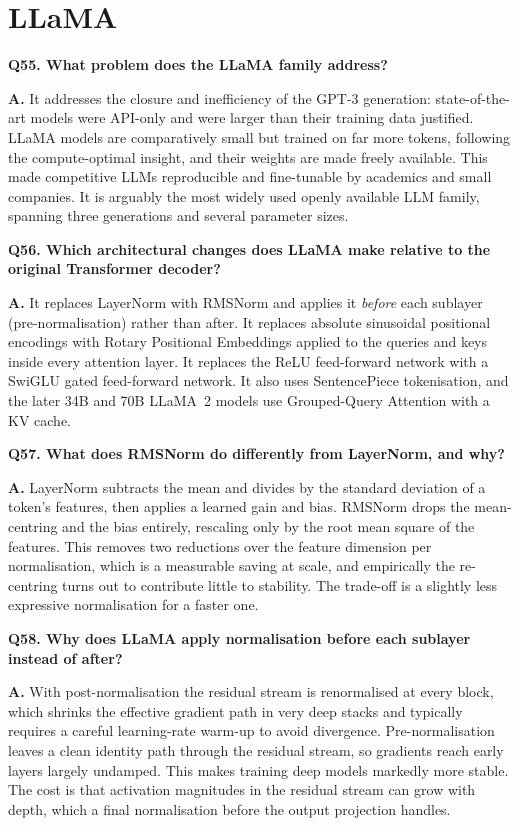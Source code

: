 \documentclass[11pt]{article}
\begin{document}
\section{LLaMA}

\noindent\textbf{Q55. What problem does the LLaMA family address?}

\noindent\textbf{A.} It addresses the closure and inefficiency of the GPT-3 generation: state-of-the-art models were API-only and were larger than their training data justified. LLaMA models are comparatively small but trained on far more tokens, following the compute-optimal insight, and their weights are made freely available. This made competitive LLMs reproducible and fine-tunable by academics and small companies. It is arguably the most widely used openly available LLM family, spanning three generations and several parameter sizes.

\medskip
\noindent\textbf{Q56. Which architectural changes does LLaMA make relative to the original Transformer decoder?}

\noindent\textbf{A.} It replaces LayerNorm with RMSNorm and applies it \emph{before} each sublayer (pre-normalisation) rather than after. It replaces absolute sinusoidal positional encodings with Rotary Positional Embeddings applied to the queries and keys inside every attention layer. It replaces the ReLU feed-forward network with a SwiGLU gated feed-forward network. It also uses SentencePiece tokenisation, and the later 34B and 70B LLaMA~2 models use Grouped-Query Attention with a KV cache.

\medskip
\noindent\textbf{Q57. What does RMSNorm do differently from LayerNorm, and why?}

\noindent\textbf{A.} LayerNorm subtracts the mean and divides by the standard deviation of a token's features, then applies a learned gain and bias. RMSNorm drops the mean-centring and the bias entirely, rescaling only by the root mean square of the features. This removes two reductions over the feature dimension per normalisation, which is a measurable saving at scale, and empirically the re-centring turns out to contribute little to stability. The trade-off is a slightly less expressive normalisation for a faster one.

\medskip
\noindent\textbf{Q58. Why does LLaMA apply normalisation before each sublayer instead of after?}

\noindent\textbf{A.} With post-normalisation the residual stream is renormalised at every block, which shrinks the effective gradient path in very deep stacks and typically requires a careful learning-rate warm-up to avoid divergence. Pre-normalisation leaves a clean identity path through the residual stream, so gradients reach early layers largely undamped. This makes training deep models markedly more stable. The cost is that activation magnitudes in the residual stream can grow with depth, which a final normalisation before the output projection handles.
\end{document}
